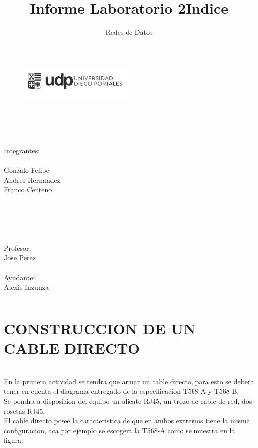 \documentclass[onecolumn,12pt]{IEEEtran}
\begin{document}
\title{Informe Laboratorio 2}
\author{Redes de Datos}

\begin{figure}[h]
\includegraphics[width=0.50\textwidth]{logo_udp.png}
\label{fig:mesh1}
\\
\\
\\
\\
\\
\maketitle
\end{figure}
\begin{center}
Integrantes:\\
\hfill \\
Gonzalo Felipe\\
Andres Hernandez\\
Franco Centeno\\
\hfill \\
\hfill \\
\hfill \\
\hfill \\
\ \hfill \\
Profesor:\\
Jose Perez\\ \hfill \\
Ayudante:\\
Alexis Inzunza\\
\end{center}

\newpage
\title{Indice}
\author{ }
\maketitle
\hrule
\tableofcontents


\newpage
\section{CONSTRUCCION DE UN CABLE DIRECTO}
\hfill \\

En la primera actividad se tendra que armar un cable directo, para esto se debera tener en cuenta el diagrama entregado de la especificacion T568-A y T568-B.\\
Se pondra a disposicion del equipo un alicate RJ45, un trozo de cable de red, dos rosetas RJ45.\\
El cable directo posee la caracteristica de que en ambos extremos tiene la misma configuracion, aca por ejemplo se escogera la T568-A como se muestra en la figura:
\end{document}
